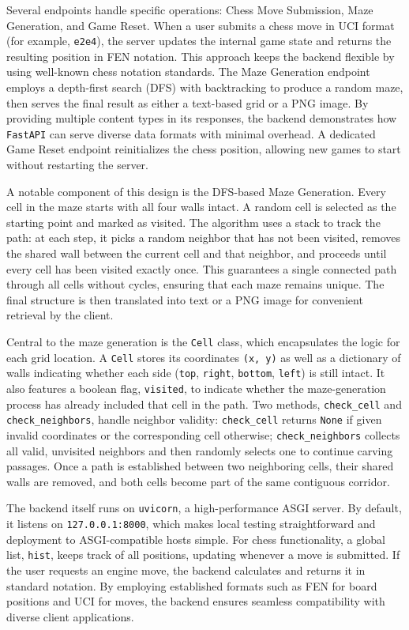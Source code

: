 \documentclass[12pt,a4paper]{article}
\begin{document}
Several endpoints handle specific operations: Chess Move Submission, Maze Generation, and Game Reset. When a user submits a chess move in UCI format (for example, \texttt{e2e4}), the server updates the internal game state and returns the resulting position in FEN notation. This approach keeps the backend flexible by using well-known chess notation standards. The Maze Generation endpoint employs a depth-first search (DFS) with backtracking to produce a random maze, then serves the final result as either a text-based grid or a PNG image. By providing multiple content types in its responses, the backend demonstrates how \texttt{FastAPI} can serve diverse data formats with minimal overhead. A dedicated Game Reset endpoint reinitializes the chess position, allowing new games to start without restarting the server.

A notable component of this design is the DFS-based Maze Generation. Every cell in the maze starts with all four walls intact. A random cell is selected as the starting point and marked as visited. The algorithm uses a stack to track the path: at each step, it picks a random neighbor that has not been visited, removes the shared wall between the current cell and that neighbor, and proceeds until every cell has been visited exactly once. This guarantees a single connected path through all cells without cycles, ensuring that each maze remains unique. The final structure is then translated into text or a PNG image for convenient retrieval by the client.

Central to the maze generation is the \texttt{Cell} class, which encapsulates the logic for each grid location. A \texttt{Cell} stores its coordinates \texttt{(x, y)} as well as a dictionary of walls indicating whether each side (\texttt{top}, \texttt{right}, \texttt{bottom}, \texttt{left}) is still intact. It also features a boolean flag, \texttt{visited}, to indicate whether the maze-generation process has already included that cell in the path. Two methods, \texttt{check\_cell} and \texttt{check\_neighbors}, handle neighbor validity: \texttt{check\_cell} returns \texttt{None} if given invalid coordinates or the corresponding cell otherwise; \texttt{check\_neighbors} collects all valid, unvisited neighbors and then randomly selects one to continue carving passages. Once a path is established between two neighboring cells, their shared walls are removed, and both cells become part of the same contiguous corridor.

The backend itself runs on \texttt{uvicorn}, a high-performance ASGI server. By default, it listens on \texttt{127.0.0.1:8000}, which makes local testing straightforward and deployment to ASGI-compatible hosts simple. For chess functionality, a global list, \texttt{hist}, keeps track of all positions, updating whenever a move is submitted. If the user requests an engine move, the backend calculates and returns it in standard notation. By employing established formats such as FEN for board positions and UCI for moves, the backend ensures seamless compatibility with diverse client applications.
\end{document}
